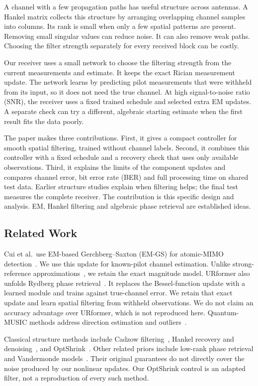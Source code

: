 \documentclass[10pt,journal,letterpaper]{IEEEtran}
\begin{document}
A channel with a few propagation paths has useful structure across antennas. A Hankel matrix collects this structure by arranging overlapping channel samples into columns. Its rank is small when only a few spatial patterns are present. Removing small singular values can reduce noise. It can also remove weak paths. Choosing the filter strength separately for every received block can be costly.

Our receiver uses a small network to choose the filtering strength from the current measurements and estimate. It keeps the exact Rician measurement update. The network learns by predicting pilot measurements that were withheld from its input, so it does not need the true channel. At high signal-to-noise ratio (SNR), the receiver uses a fixed trained schedule and selected extra EM updates. A separate check can try a different, algebraic starting estimate when the first result fits the data poorly.

The paper makes three contributions. First, it gives a compact controller for smooth spatial filtering, trained without channel labels. Second, it combines this controller with a fixed schedule and a recovery check that uses only available observations. Third, it explains the limits of the component updates and compares channel error, bit error rate (BER) and full processing time on shared test data. Earlier structure studies explain when filtering helps; the final test measures the complete receiver. The contribution is this specific design and analysis. EM, Hankel filtering and algebraic phase retrieval are established ideas.

\subsection{Related Work}
Cui et al.\ use EM-based Gerchberg--Saxton (EM-GS) for atomic-MIMO detection~\cite{cui2025}. We use this update for known-pilot channel estimation. Unlike strong-reference approximations~\cite{xu2025}, we retain the exact magnitude model. URformer also unfolds Rydberg phase retrieval~\cite{xiao2026}. It replaces the Bessel-function update with a learned module and trains against true-channel error. We retain that exact update and learn spatial filtering from withheld observations. We do not claim an accuracy advantage over URformer, which is not reproduced here. Quantum-MUSIC methods address direction estimation and outliers~\cite{kim2025quantummusic,banerjee2026robust}.

Classical structure methods include Cadzow filtering~\cite{cadzow1988}, Hankel recovery and denoising~\cite{chen2014emac,yin2021,zachariah2012}, and OptShrink~\cite{nadakuditi2014}. Other related priors include low-rank phase retrieval and Vandermonde models~\cite{liu2018lrpr,ying2018hvaf}. Their original guarantees do not directly cover the noise produced by our nonlinear updates. Our OptShrink control is an adapted filter, not a reproduction of every such method.
\end{document}
